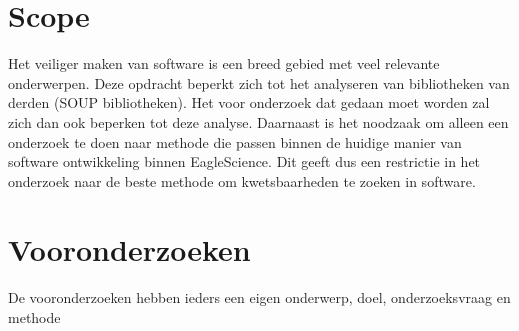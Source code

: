 \section{Scope}\label{sec:Scope}
Het veiliger maken van software is een breed gebied met veel relevante onderwerpen. Deze opdracht beperkt zich tot het analyseren van bibliotheken van derden (SOUP bibliotheken). Het voor onderzoek dat gedaan moet worden zal zich dan ook beperken tot deze analyse. Daarnaast is het noodzaak om alleen een onderzoek te doen naar methode die passen binnen de huidige manier van software ontwikkeling binnen EagleScience. Dit geeft dus een restrictie in het onderzoek naar de beste methode om kwetsbaarheden te zoeken in software.

\section{Vooronderzoeken}
De vooronderzoeken hebben ieders een eigen onderwerp, doel, onderzoeksvraag en methode
